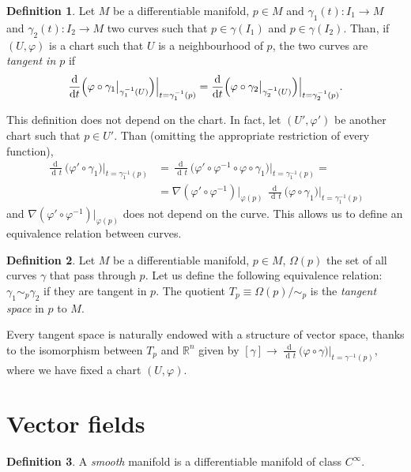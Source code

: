 \documentclass[a4paper,12pt]{book}
\newcommand{\dd}{\mathop{\mathrm{d}\!}{}}
\theoremstyle{definition}
\newtheorem{definition}{Definition}
\theoremstyle{remark}
\begin{document}
\begin{definition}
Let $M$ be a differentiable manifold, $p\in M$ and $\gamma_1(t)\colon I_1\to M$ and $\gamma_2(t)\colon I_2\to M$ two curves such that $p\in\gamma(I_1)$ and $p\in\gamma(I_2)$. Than, if $(U,\varphi)$ is a chart such that $U$ is a neighbourhood of $p$, the two curves are \emph{tangent in $p$} if
\[\frac{\dd}{\dd t}\Bigl(\varphi\circ\gamma_1\big|_{\gamma_1^{-1}(U)}\Bigr)\Big|_{t=\gamma_1^{-1}(p)}=\frac{\dd}{\dd t}\Bigl(\varphi\circ\gamma_2\big|_{\gamma_2^{-1}(U)}\Bigr)\Big|_{t=\gamma_2^{-1}(p)}.\]
\end{definition}
This definition does not depend on the chart. In fact, let $(U',\varphi')$ be another chart such that $p\in U'$. Than (omitting the appropriate restriction of every function),
\[
\begin{split}
\frac{\dd}{\dd t}\bigl(\varphi'\circ\gamma_1\bigr)\Big|_{t=\gamma_1^{-1}(p)}&=\frac{\dd}{\dd t}\bigl(\varphi'\circ\varphi^{-1}\circ\varphi\circ\gamma_1\bigr)\Big|_{t=\gamma_1^{-1}(p)}=\\
&=\nabla(\varphi'\circ\varphi^{-1})\Big|_{\varphi(p)}\ \frac{\dd}{\dd t}\bigl(\varphi\circ\gamma_1\bigr)\Big|_{t=\gamma_1^{-1}(p)}
\end{split}
\]
and $\nabla(\varphi'\circ\varphi^{-1})\big|_{\varphi(p)}$ does not depend on the curve. This allows us to define an equivalence relation between curves.

\begin{definition}
Let $M$ be a differentiable manifold, $p\in M$, $\Omega(p)$ the set of all curves $\gamma$ that pass through $p$. Let us define the following equivalence relation: $\gamma_1\sim_p\gamma_2$ if they are tangent in $p$. The quotient $T_p\equiv\Omega(p)/\sim_p$ is the \emph{tangent space} in $p$ to $M$.
\end{definition}

Every tangent space is naturally endowed with a structure of vector space, thanks to the isomorphism between $T_p$ and $\mathbb R^n$ given by $[\gamma]\to\frac{\dd}{\dd t}\bigl(\varphi\circ\gamma\bigr)\big|_{t=\gamma^{-1}(p)}$, where we have fixed a chart $(U,\varphi)$.

\section{Vector fields}

\begin{definition}
A \emph{smooth} manifold is a differentiable manifold of class $C^\infty$.
\end{definition}
\end{document}
